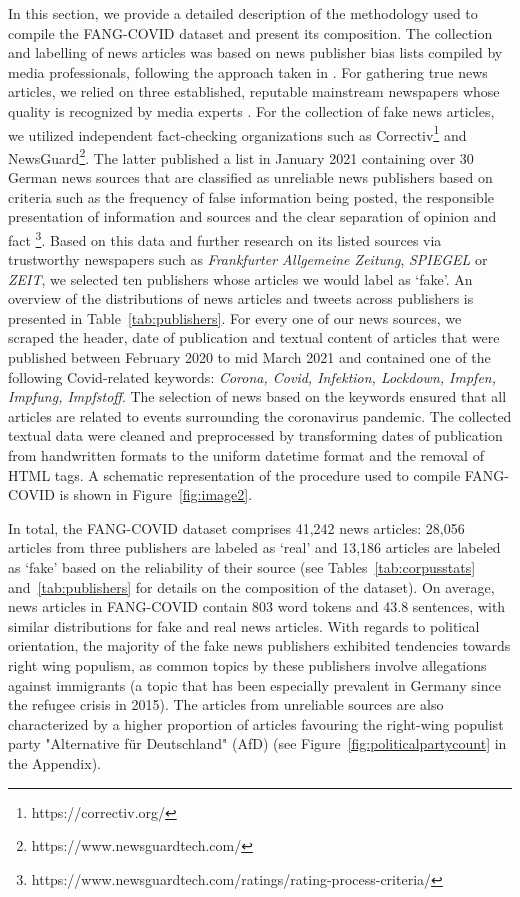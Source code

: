 \documentclass[11pt]{article}
\begin{document}
In this section, we provide a detailed description of the methodology used to compile the FANG-COVID dataset and present its composition. The collection and labelling of news articles was based on news publisher bias lists compiled by media professionals, following the approach taken in \citet{kiesel2019semeval}. For gathering true news articles, we relied on three established, reputable mainstream newspapers whose quality is recognized by media experts \citep{wellbrock2011journalistische}. For the collection of fake news articles, we utilized independent fact-checking organizations such as Correctiv\footnote{https://correctiv.org/} and NewsGuard\footnote{https://www.newsguardtech.com/}. The latter published a list in January 2021 containing over 30 German news sources that are classified as unreliable news publishers based on criteria such as the frequency of false information being posted, the responsible presentation of information and sources and the clear separation of opinion and fact \footnote{https://www.newsguardtech.com/ratings/rating-process-criteria/}. Based on this data and further research on its listed sources via trustworthy newspapers such as \emph{Frankfurter Allgemeine Zeitung}, \emph{SPIEGEL} or \emph{ZEIT}, we selected ten publishers whose articles we would label as `fake'. An overview of the distributions of news articles and tweets across publishers is presented in Table~\ref{tab:publishers}. For every one of our news sources, we scraped the header, date of publication and textual content of articles that were published between February 2020 to mid March 2021 and contained one of the following Covid-related keywords: \emph{Corona, Covid, Infektion, Lockdown, Impfen, Impfung, Impfstoff}. The selection of news based on the keywords ensured that all articles are related to events surrounding the coronavirus pandemic. The collected textual data were cleaned and preprocessed by transforming dates of publication from handwritten formats to the uniform datetime format and the removal of HTML tags. A schematic representation of the procedure used to compile FANG-COVID is shown in Figure~\ref{fig:image2}. 

In total, the FANG-COVID dataset comprises 41,242 news articles: 28,056 articles from three publishers are labeled as `real' and 13,186 articles are labeled as `fake' based on the reliability of their source (see Tables~\ref{tab:corpusstats} and~\ref{tab:publishers} for details on the composition of the dataset). On average, news articles in FANG-COVID contain 803 word tokens and 43.8 sentences, with similar distributions for fake and real news articles. With regards to political orientation, the majority of the fake news publishers exhibited tendencies towards right wing populism, as common topics by these publishers involve allegations against immigrants (a topic that has been especially prevalent in Germany since the refugee crisis in 2015).  The articles from unreliable sources are also characterized by a higher proportion of articles favouring the right-wing populist party "Alternative für Deutschland" (AfD)  (see  Figure~\ref{fig:politicalpartycount} in the Appendix).
\end{document}
